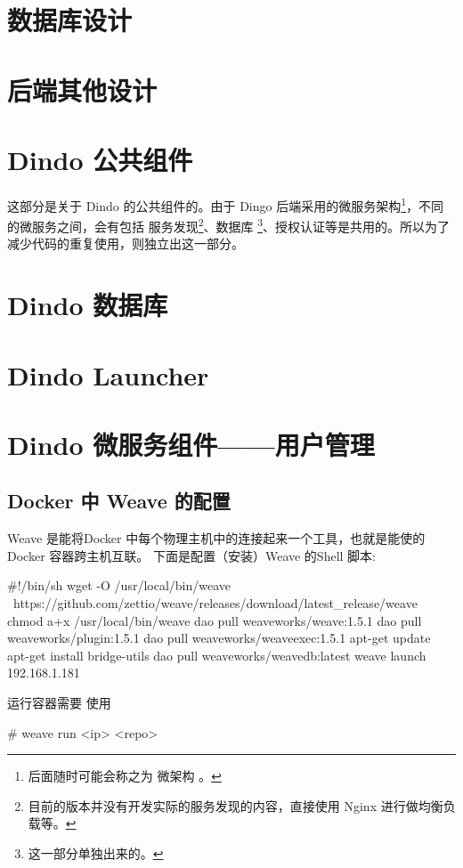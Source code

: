 \documentclass{dingo}
\begin{document}
    \section{数据库设计}
    \section{后端其他设计}
  \section{Dindo 公共组件}
  这部分是关于 Dindo 的公共组件的。由于 Dingo 后端采用的微服务架构\footnote{后面随时可能会称之为 微架构 。}，不同的微服务之间，会有包括
  服务发现\footnote{目前的版本并没有开发实际的服务发现的内容，直接使用 Nginx 进行做均衡负载等。}、数据库
  \footnote{这一部分单独出来的。}、授权认证等是共用的。所以为了减少代码的重复使用，则独立出这一部分。
  
  \section{Dindo 数据库}
  
  \section{Dindo Launcher}
  
  \section{Dindo 微服务组件——用户管理}
  
  \newpage
  \begin{appendix}
	  	\section{Docker 中 Weave  的配置} %
	  	Weave 是能将Docker 中每个物理主机中的连接起来一个工具，也就是能使的 Docker 容器跨主机互联。
	  	下面是配置（安装）Weave 的Shell 脚本:
	  	\begin{shell}[caption=Weave 安装]
#!/bin/sh
wget -O /usr/local/bin/weave \
https://github.com/zettio/weave/releases/download/latest_release/weave
chmod a+x /usr/local/bin/weave
dao pull weaveworks/weave:1.5.1
dao pull weaveworks/plugin:1.5.1
dao pull weaveworks/weaveexec:1.5.1
apt-get update
apt-get install bridge-utils
dao pull weaveworks/weavedb:latest
weave launch 192.168.1.181
	  	\end{shell}
	  	运行容器需要 使用
	  	\begin{shell}
# weave run <ip> <repo> 
	  	\end{shell}
  \end{appendix} 
  
\end{document}
